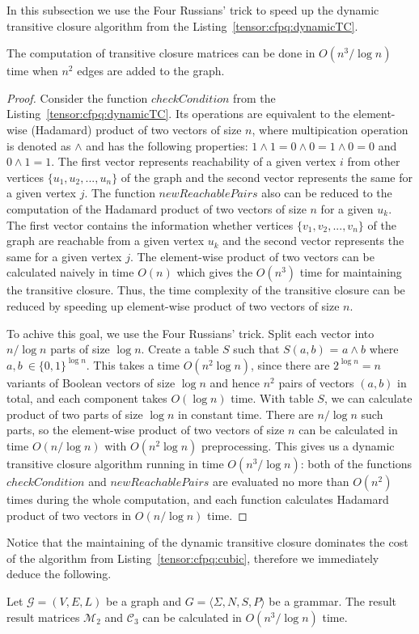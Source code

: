 In this subsection we use the Four Russians' trick to speed up the dynamic transitive closure algorithm from the Listing~\ref{tensor:cfpq:dynamicTC}.
\begin{theorem}{}
    The computation of transitive closure matrices can be done in $O(n^3/\log n)$ time when $n^2$ edges are added to the graph.
\end{theorem}
\begin{proof}
Consider the function $checkCondition$ from the Listing~\ref{tensor:cfpq:dynamicTC}. Its operations are equivalent to the element-wise (Hadamard) product of two vectors of size $n$, where multipication operation is denoted as $\wedge$ and has the following properties: $1 \wedge 1 = 0 \wedge 0 = 1 \wedge 0 = 0$ and $0 \wedge 1 = 1$. The first vector represents reachability of a given vertex $i$ from other vertices $\{u_1, u_2, ..., u_n\}$ of the graph and the second vector represents the same for a given vertex $j$. The function $newReachablePairs$ also can be reduced to the computation of the Hadamard product of two vectors of size $n$ for a given $u_k$. The first vector contains the information whether vertices  $\{v_1, v_2, ..., v_n\}$ of the graph are reachable from a given vertex $u_k$ and the second vector represents the same for a given vertex $j$. The element-wise product of two vectors can be calculated naively in time $O(n)$ which gives the $O(n^3)$ time for maintaining the transitive closure. Thus, the time complexity of the transitive closure can be reduced by speeding up element-wise product of two vectors of size $n$. 


To achive this goal, we use the Four Russians' trick. Split each vector into $n/\log n$ parts of size $\log n$. Create a table $S$ such that $S(a, b)$ = $a \wedge b$ where $a, b \ \in {\{0,1\}}^{\log n}$. This takes a time $O(n^2 \log n)$, since there are $2^{\log n} = n$ variants of Boolean vectors of size $\log n$ and hence $n^2$ pairs of vectors $(a, b)$ in total, and each component takes $O(\log n)$ time. With table $S$, we can calculate product of two parts of size $\log n$ in constant time. There are $n/\log n$ such parts, so the element-wise product of two vectors of size $n$ can be calculated in time $O(n/\log n)$ with $O(n^2 \log n)$ preprocessing. This gives us a dynamic transitive closure algorithm running in time $O(n^3/\log n)$: both of the functions $checkCondition$ and  $newReachablePairs$ are evaluated no more than $O(n^2)$ times during the whole computation, and each function calculates Hadamard product of two vectors in $O(n/\log n)$ time.
\end{proof} 
Notice that the maintaining of the dynamic transitive closure dominates the cost of the algorithm from Listing~\ref{tensor:cfpq:cubic}, therefore we immediately deduce the following.
\begin{corollary}{}
    Let $\mathcal{G} = (V,E,L)$ be a graph and $G = \langle\Sigma, N, S, P\rangle$ be a grammar.
    The result result matrices $\mathcal{M}_2$ and $\mathcal{C}_3$ can be calculated in $O(n^3/\log n)$ time.
\end{corollary}


